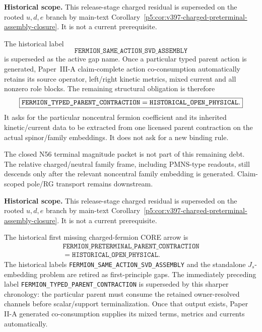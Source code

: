 \documentclass[11pt,a4paper]{article}
\begin{document}
\begin{remark}
\label{p5:rem:v394-parent-contraction-frontier}
\noindent\textbf{Historical scope.} This release-stage charged residual is superseded on the rooted $u,d,e$ branch by main-text Corollary~\ref{p5:cor:v397-charged-preterminal-assembly-closure}. It is not a current prerequisite.

The historical label
\[
 \texttt{FERMION\_SAME\_ACTION\_SVD\_ASSEMBLY}
\]
is superseded as the active gap name.  Once a particular typed parent action
is generated, Paper~III-A claim-complete action co-consumption automatically
retains its source operator, left/right kinetic metrics, mixed current and all
nonzero role blocks.  The remaining structural obligation is therefore
\[
 \boxed{\texttt{FERMION\_TYPED\_\allowbreak PARENT\_\allowbreak CONTRACTION}
        =\texttt{HISTORICAL\_OPEN\_PHYSICAL}.}
\]
It asks for the particular noncentral fermion coefficient and its inherited
kinetic/current data to be extracted from one licensed parent contraction on
the actual spinor/family embeddings.  It does not ask for a new binding rule.

The closed N56 terminal magnitude packet is not part of this remaining debt.
The relative charged/neutral family frame, including PMNS-type readouts, still
descends only after the relevant noncentral family embedding is generated.
Claim-scoped pole/RG transport remains downstream.
\end{remark}

\begin{corollary}
\label{p5:cor:v395-preterminal-frontier}
\noindent\textbf{Historical scope.} This release-stage charged residual is superseded on the rooted $u,d,e$ branch by main-text Corollary~\ref{p5:cor:v397-charged-preterminal-assembly-closure}. It is not a current prerequisite.

The historical first missing charged-fermion CORE arrow is
\[
 \boxed{\begin{gathered}
 \texttt{FERMION\_PRETERMINAL\_PARENT\_CONTRACTION}\\
 =\texttt{HISTORICAL\_OPEN\_PHYSICAL}.
 \end{gathered}}
\]
The historical labels
\texttt{FERMION\_SAME\_ACTION\_SVD\_ASSEMBLY} and the standalone
$J_s$-embedding problem are retired as first-principle gaps.  The immediately
preceding label \texttt{FERMION\_TYPED\_\allowbreak PARENT\_\allowbreak CONTRACTION} is superseded by
this sharper chronology: the particular parent must consume the retained
owner-resolved channels before scalar/support terminalization.  Once that
output exists, Paper II-A generated co-consumption supplies its mixed terms,
metrics and currents automatically.
\end{corollary}
\end{document}
